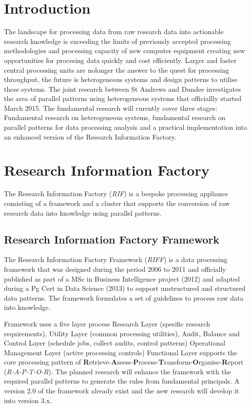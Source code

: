 \documentclass{acm_proc_article-sp}
\begin{document}
\section{Introduction}
The landscape for processing data from raw research data into actionable research knowledge is exceeding the limits of previously accepted processing methodologies and processing capacity of new computer equipment creating new opportunities for procesing data quickly and cost efficiently. Larger and faster central processing units are nolonger the answer to the quest for processing throughput, the future is heterogeneous systems and design patterns to utilise these systems.
The joint research between St Andrews and Dundee investigates the area of parallel patterns using heterogeneous systems that officiallly started March 2015. The fundamental research will curently cover three stages:
Fundamental research on heterogeneous systems, fundamental research on parallel patterns for data processing analysis and a practical implementation into an enhanced version of the Research Information Factory. 
\section{Research Information Factory}
The Research Information Factory (\textit{RIF}) is a bespoke processing appliance consisting of a framework and a cluster that supports the conversion of raw research data into knowledge using parallel patterns. 
\subsection{Research Information Factory Framework}
The Research Information Factory Framework (\textit{RIFF}) is a data processing framework that was designed during the period 2006 to 2011 and officially published as part of a MSc in Business Intelligence project (2012) and adapted during a Pg Cert in Data Science (2013) to support unstructured and structured data patterns.  
The framework formulates a set of guidelines to process raw data into knowledge. 

Framework uses a five layer process Research Layer (spesific research requirements), Utility Layer (common processing utilities), Audit, Balance and Control Layer (schedule jobs, collect audits, control patterns)
Operational Management Layer (active processing controls) Functional Layer supports the core processing pattern of \textbf{R}etrieve-\textbf{A}ssess-\textbf{P}rocess-\textbf{T}ransform-\textbf{O}rganise-\textbf{R}eport (\textit{R-A-P-T-O-R}). The planned research will enhance the framework with the required parallel patterns to generate the rules from fundamental principals. A version 2.0 of the framework already exist and the new research will develop it into version 3.x.
\end{document}
